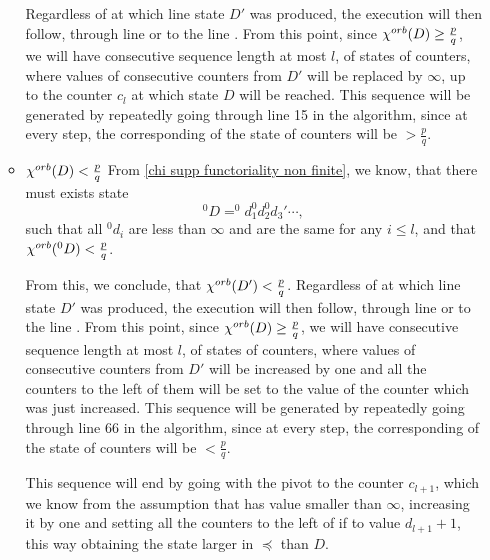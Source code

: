 \begin{itemize}
\begin{itemize}
Regardless of at which line state $D'$ was produced, the execution will then follow, 
through line  or to the line    . From this point, since ${\chi^{orb}(D)} \geq \frac{p}{q}$, we will 
have consecutive sequence length at most $l$, of states of counters, where 
values of consecutive counters 
from $D'$ will be 
replaced by $\infty$, up to the counter $c_l$ at which state $D$ will be reached. 
This sequence will be generated by repeatedly going through line 15 in the algorithm, since 
at every step, the corresponding \Eoc of the state of counters will be $> \frac{p}{q}$.

\item ${\chi^{orb}(D)} < \frac{p}{q}$
From \ref{chi supp functoriality non finite}, we know, that there must exists state 
\begin{equation}^0D = ^0d_1^0d_2^0d_3'\cdots,
\end{equation} 
such that 
all $^0d_i$ are less than $\infty$ and are the same for 
any $i \leq l$, and that ${\chi^{orb}(^0D)} < \frac{p}{q}$. 

From this, we conclude, that ${\chi^{orb}(D')} < \frac{p}{q}$. 
Regardless of at which line state $D'$ was produced, the execution will then follow, 
through line  or to the line    . From this point, since ${\chi^{orb}(D)} \geq \frac{p}{q}$, we will 
have consecutive sequence length at most $l$, of states of counters, where 
values of consecutive counters 
from $D'$ will be increased by one and all the counters to the left of them will be set to 
the value of the counter which was just increased. 
This sequence will be generated by repeatedly going through line 66 in the algorithm, since 
at every step, the corresponding \Eoc of the state of counters will be $< \frac{p}{q}$.

This sequence will end by going with the pivot to the counter $c_{l+1}$, which we 
know from the assumption that has value smaller than $\infty$, increasing it by one 
and setting all the counters to the left of if to value $d_{l+1}+1$, this way obtaining 
the state larger in $\preceq$ than $D$. 
\end{itemize}


\end{itemize}
